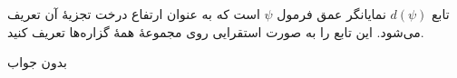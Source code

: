 تابع $d(\psi)$ نمایانگر عمق فرمول $\psi$ است که به عنوان ارتفاع درخت تجزیهٔ آن تعریف می‌شود. این تابع را به صورت استقرایی روی مجموعهٔ همهٔ گزاره‌ها تعریف کنید.
\begin{ans}
بدون جواب
\end{ans}
